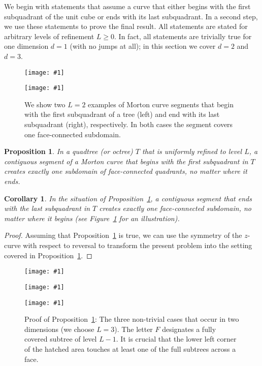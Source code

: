 \documentclass[a4paper,11pt]{article}
\newcommand{\inputtikz}[1]{\texttt{[image: \#1]}}
\newcommand{\figlab}[1]{\label{fig:#1}}
\newcommand{\figref}[1]{Figure~\ref{fig:#1}}
\newtheorem{prop}[thm]{Proposition}
\newtheorem{cor}[thm]{Corollary}
\begin{document}
We begin with statements that assume a curve that either begins with the first
subquadrant of the unit cube or ends with its last subquadrant.  In a second
step, we use these statements to prove the final result.  All statements are
stated for arbitrary levels of refinement $L \ge 0$.  In fact, all statements
are trivially true for one dimension $d=1$ (with no jumps at all); in this
section we cover $d = 2$ and $d = 3$.
\begin{figure}\centering
\begin{minipage}{0.49\textwidth}\centering
    \inputtikz{onepiece1}
  \end{minipage}
  \begin{minipage}{0.49\textwidth}\centering
    \inputtikz{onepiece2}
  \end{minipage}
  \caption{We show two $L = 2$ examples of Morton curve segments that begin
           with the first subquadrant of a tree (left) and end with its last
           subquadrant (right), respectively.  In both cases the segment covers
           one face-connected subdomain.}
  \figlab{onepiece}
\end{figure}
\begin{prop}
  \label{illpropfirst}
  In a quadtree (or octree) $T$ that is uniformly refined to level $L$, a
  contiguous segment of a Morton curve that begins with the first subquadrant
  in $T$ creates exactly one subdomain of face-connected quadrants, no matter
  where it ends.
\end{prop}
\begin{cor}
  \label{illcorlast}
  In the situation of Proposition~\ref{illpropfirst}, a contiguous segment that ends
  with the last subquadrant in $T$ creates exactly one face-connected
  subdomain, no matter where it begins (see \figref{onepiece} for an
  illustration).
\end{cor}
\begin{proof}
  Assuming that Proposition~\ref{illpropfirst} is true, we can use the symmetry of
  the $z$-curve with respect to reversal to transform the present
  problem into the setting covered in Proposition~\ref{illpropfirst}.
\end{proof}
\begin{figure}\centering
\begin{minipage}{0.32\textwidth}\centering
    \inputtikz{twodproof1}
  \end{minipage}
  \begin{minipage}{0.32\textwidth}\centering
    \inputtikz{twodproof2}
  \end{minipage}
  \begin{minipage}{0.32\textwidth}\centering
    \inputtikz{twodproof3}
  \end{minipage}
  \caption{Proof of Proposition~\ref{illpropfirst}:  The three non-trivial cases
    that occur in two dimensions (we choose $L = 3$).  The letter $F$
    designates a fully covered subtree of level $L - 1$.  It is crucial that
    the lower left corner of the hatched area touches at least one of the full
    subtrees across a face.}
  \figlab{twodproof}
\end{figure}
\end{document}
